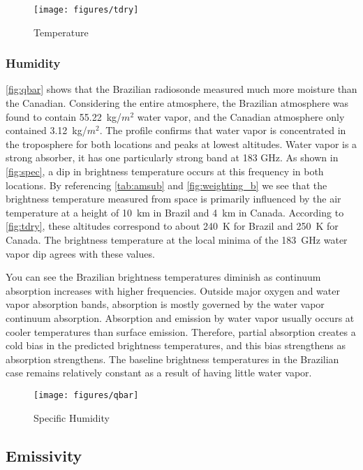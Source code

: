 \documentclass[twocol]{ametsoc}
\begin{document}
\begin{figure}
	\centering
	\texttt{[image: figures/tdry]}
	\caption{Temperature}
	\label{fig:tdry}
\end{figure}

\subsubsection{Humidity}

\autoref{fig:qbar} shows that the Brazilian radiosonde measured much more moisture than the Canadian.
Considering the entire atmosphere, the Brazilian atmosphere was found to contain 55.22~kg/$m^2$ water vapor, and the Canadian atmosphere only contained 3.12~kg/$m^2$.
The profile confirms that water vapor is concentrated in the troposphere for both locations and peaks at lowest altitudes.
Water vapor is a strong absorber, it has one particularly strong band at 183 GHz.
As shown in \autoref{fig:spec}, a dip in brightness temperature occurs at this frequency in both locations.
By referencing \autoref{tab:amsub} and \autoref{fig:weighting_b} we see that the brightness temperature measured from space is primarily influenced by the air temperature at a height of 10~km in Brazil and 4~km in Canada.
According to \autoref{fig:tdry}, these altitudes correspond to about 240~K for Brazil and 250~K for Canada.
The brightness temperature at the local minima of the 183~GHz water vapor dip agrees with these values.


You can see the Brazilian brightness temperatures diminish as continuum absorption increases with higher frequencies.
Outside major oxygen and water vapor absorption bands, absorption is mostly governed by the water vapor continuum absorption.
Absorption and emission by water vapor usually occurs at cooler temperatures than surface emission.
Therefore, partial absorption creates a cold bias in the predicted brightness temperatures, and this bias strengthens as absorption strengthens.
The baseline brightness temperatures in the Brazilian case remains relatively constant as a result of having little water vapor.

\begin{figure}
	\centering
	\texttt{[image: figures/qbar]}
	\caption{Specific Humidity}
	\label{fig:qbar}
\end{figure}

\subsection{Emissivity}
\end{document}
